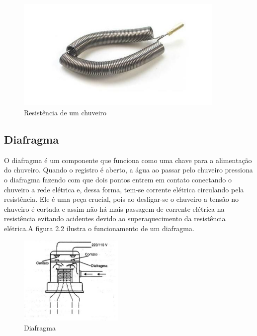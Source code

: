 \begin{figure}[h]

\center

\includegraphics[width=10cm]{imagens/resistencia.jpg}

\label{Resistência de um chuveiro}

\caption{Resistência de um chuveiro}

\end{figure}

\subsection{Diafragma}

O diafragma é um componente que funciona como uma chave para a alimentação do chuveiro. Quando o registro é aberto, a água ao passar pelo chuveiro pressiona o diafragma fazendo com que dois pontos entrem em contato conectando o chuveiro a rede elétrica e, dessa forma, tem-se corrente elétrica circulando pela resistência. Ele é uma peça crucial, pois ao desligar-se o chuveiro a tensão no chuveiro é cortada e assim não há mais passagem de corrente elétrica na resistência evitando acidentes devido ao superaquecimento da resistência elétrica.A figura 2.2 ilustra o funcionamento de um diafragma.

\begin{figure}[!htb]

\center

\includegraphics[width=5cm]{imagens/diafragma.png}

\label{Diafragma}

\caption{Diafragma}

\end{figure}

